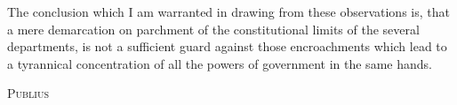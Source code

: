 The conclusion which I am warranted in drawing from these observations is, that a mere demarcation on parchment of the constitutional limits of the several departments, is not a sufficient guard against those encroachments which lead to a tyrannical concentration of all the powers of government in the same hands.

\vspace{.5cm}
\textsc{Publius}
